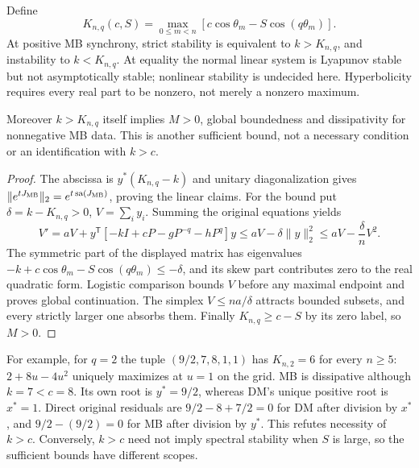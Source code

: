 \begin{corollary}
\label{cor:P08-stability}
Define
\begin{equation}
 K_{n,q}(c,S)=\max_{0\le m<n}[c\cos\theta_m-S\cos(q\theta_m)].
 \label{eq:P08-K}
\end{equation}
At positive MB synchrony, strict stability is equivalent to $k>K_{n,q}$,
and instability to $k<K_{n,q}$. At equality the normal linear system
is Lyapunov stable but not asymptotically stable; nonlinear stability is
undecided here. Hyperbolicity requires every real part to be nonzero,
not merely a nonzero maximum.

Moreover $k>K_{n,q}$ itself implies $M>0$, global boundedness and
dissipativity for nonnegative MB data. This is another sufficient bound,
not a necessary condition or an identification with $k>c$.
\end{corollary}
\begin{proof}
The abscissa is $y^*(K_{n,q}-k)$ and unitary diagonalization gives
$\|e^{tJ_{\mathrm{MB}}}\|_2=e^{t\operatorname{sa}(J_{\mathrm{MB}})}$, proving the linear claims.
For the bound put $\delta=k-K_{n,q}>0$, $V=\sum_i y_i$. Summing the
original equations yields
\begin{equation}
 V'=aV+y^{\mathsf T}[-kI+cP-gP^{-q}-hP^q]y
 \le aV-\delta\|y\|_2^2\le aV-\frac\delta nV^2.
 \label{eq:P08-sum}
\end{equation}
The symmetric part of the displayed matrix has eigenvalues
$-k+c\cos\theta_m-S\cos(q\theta_m)\le-\delta$, and its skew part
contributes zero to the real quadratic form. Logistic comparison bounds
$V$ before any maximal endpoint and proves global continuation.
The simplex $V\le na/\delta$ attracts bounded subsets, and every
strictly larger one absorbs them. Finally $K_{n,q}\ge c-S$ by its
zero label, so $M>0$.
\end{proof}
For example, for $q=2$ the tuple $(9/2,7,8,1,1)$ has $K_{n,2}=6$
for every $n\ge5$: $2+8u-4u^2$ uniquely maximizes at $u=1$ on the
grid. MB is dissipative although $k=7<c=8$. Its own root is $y^*=9/2$,
whereas DM's unique positive root is $x^*=1$. Direct original residuals
are $9/2-8+7/2=0$ for DM after division by $x^*$, and
$9/2-(9/2)=0$ for MB after division by $y^*$. This refutes necessity
of $k>c$. Conversely, $k>c$ need not imply spectral stability when
$S$ is large, so the sufficient bounds have different scopes.

